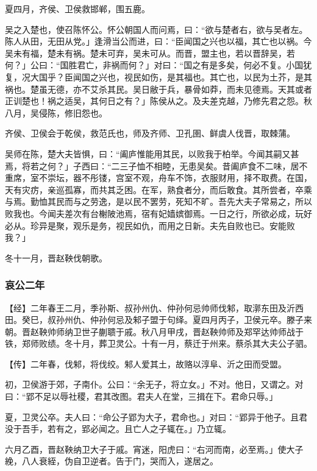 \documentclass[]{article}
\begin{document}
夏四月，齐侯、卫侯救邯郸，围五鹿。

吴之入楚也，使召陈怀公。怀公朝国人而问焉，曰：``欲与楚者右，欲与吴者左。陈人从田，无田从党。」逢滑当公而进，曰：``臣闻国之兴也以福，其亡也以祸。今吴未有福，楚未有祸。楚未可弃，吴未可从。而晋，盟主也，若以晋辞吴，若何？」公曰：``国胜君亡，非祸而何？」对曰：``国之有是多矣，何必不复。小国犹复，况大国乎？臣闻国之兴也，视民如伤，是其福也。其亡也，以民为土芥，是其祸也。楚虽无德，亦不艾杀其民。吴日敝于兵，暴骨如莽，而未见德焉。天其或者正训楚也！祸之适吴，其何日之有？」陈侯从之。及夫差克越，乃修先君之怨。秋八月，吴侵陈，修旧怨也。

齐侯、卫侯会于乾侯，救范氏也，师及齐师、卫孔圉、鲜虞人伐晋，取棘蒲。

吴师在陈，楚大夫皆惧，曰：``阖庐惟能用其民，以败我于柏举。今闻其嗣又甚焉，将若之何？」子西曰：``二三子恤不相睦，无患吴矣。昔阖庐食不二味，居不重席，室不崇坛，器不彤镂，宫室不观，舟车不饰，衣服财用，择不取费。在国，天有灾疠，亲巡孤寡，而共其乏困。在军，熟食者分，而后敢食。其所尝者，卒乘与焉。勤恤其民而与之劳逸，是以民不罢劳，死知不旷。吾先大夫子常易之，所以败我也。今闻夫差次有台榭陂池焉，宿有妃嫱嫔御焉。一日之行，所欲必成，玩好必从。珍异是聚，观乐是务，视民如仇，而用之日新。夫先自败也已。安能败我？」

冬十一月，晋赵鞅伐朝歌。

\hypertarget{header-n3056}{%
\subsubsection{哀公二年}\label{header-n3056}}

【经】二年春王二月，季孙斯、叔孙州仇、仲孙何忌帅师伐邾，取漷东田及沂西田。癸巳，叔孙州仇、仲孙何忌及邾子盟于句绎。夏四月丙子，卫侯元卒。滕子来朝。晋赵鞅帅师纳卫世子蒯聩于戚。秋八月甲戌，晋赵鞅帅师及郑罕达帅师战于铁，郑师败绩。冬十月，葬卫灵公。十有一月，蔡迁于州来。蔡杀其大夫公子驷。

【传】二年春，伐邾，将伐绞。邾人爱其土，故赂以淳阜、沂之田而受盟。

初，卫侯游于郊，子南仆。公曰：``余无子，将立女。」不对。他日，又谓之。对曰：``郢不足以辱社稷，君其改图。君夫人在堂，三揖在下。君命只辱。」

夏，卫灵公卒。夫人曰：``命公子郢为大子，君命也。」对曰：``郢异于他子。且君没于吾手，若有之，郢必闻之。且亡人之子辄在。」乃立辄。

六月乙酉，晋赵鞅纳卫大子于戚。宵迷，阳虎曰：``右河而南，必至焉。」使大子絻，八人衰絰，伪自卫逆者。告于门，哭而入，遂居之。
\end{document}
